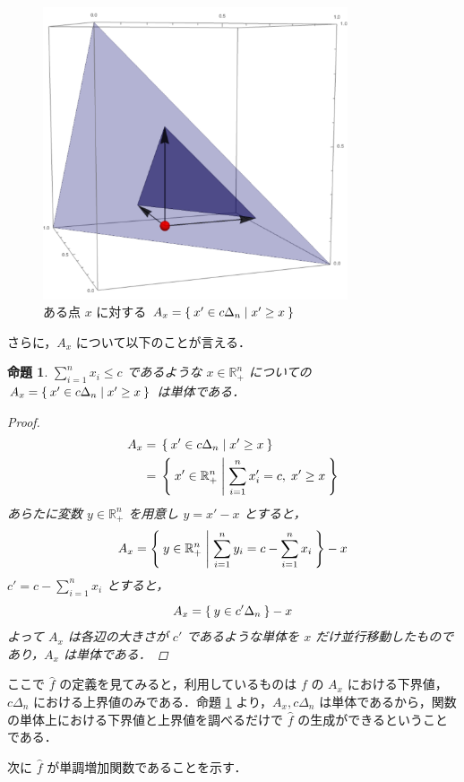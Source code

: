 \documentclass[a4paper,11pt]{jreport}
\newtheorem{proposition}{命題}
\begin{document}
\begin{figure}
\begin{center}
\includegraphics[width=9cm]{graphs/a_on_simplex.pdf}
\caption{ある点 $ x $ に対する $ A_x = \Set{x' \in c \Delta_n | x' \geq x} $}
\label{fig:a_on_simplex}
\end{center}
\end{figure}

さらに，$ A_x $ について以下のことが言える．

\begin{proposition} \label{prop:a_x_is_simplex}
$ \sum_{i = 1}^{n} x_i \leq c $ であるような $ x \in \mathbb{R}_+^n $ についての $ A_x = \Set{x' \in c \Delta_n | x' \geq x} $ は単体である．

\begin{proof}
\begin{align*}
A_x = & \; \Set{x' \in c \Delta_n | x' \geq x} \\
= & \; \Set{x' \in \mathbb{R}_+^n | \sum_{i = 1}^{n} x'_i = c, \; x' \geq x}
\end{align*}
あらたに変数 $ y \in \mathbb{R}_+^n $ を用意し $ y = x' - x $ とすると，
$$ A_x = \Set{y \in \mathbb{R}_+^n | \sum_{i = 1}^{n} y_i = c - \sum_{i = 1}^{n} x_i} - x $$
$ c' = c - \sum_{i = 1}^{n} x_i $ とすると，
$$ A_x = \Set{y \in c' \Delta_n} - x $$
よって $ A_x $ は各辺の大きさが $ c' $ であるような単体を $ x $ だけ並行移動したものであり，$ A_x $ は単体である．
\end{proof}

\end{proposition}

ここで $ \hat{f} $ の定義を見てみると，利用しているものは $ f $ の $ A_x $ における下界値，$ c \Delta_n $ における上界値のみである．命題 \ref{prop:a_x_is_simplex} より，$ A_x, c \Delta_n $ は単体であるから，関数の単体上における下界値と上界値を調べるだけで $ \hat{f} $ の生成ができるということである．\par
次に $ \hat{f} $ が単調増加関数であることを示す．
\end{document}
